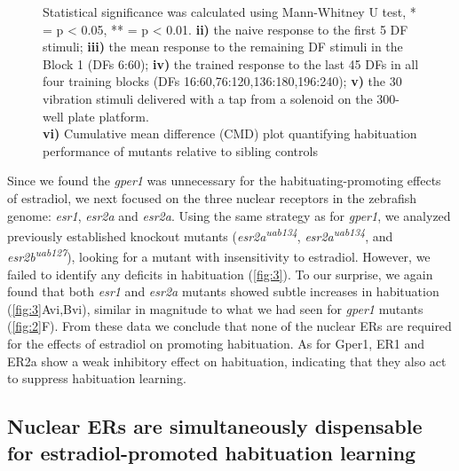 \documentclass[10pt,lineno]{RandlettLab_elife}
\begin{document}
{\begin{figure}
\begin{fullwidth}
\begin{center}
{Statistical significance was calculated using Mann-Whitney U test, * = p < 0.05, ** = p < 0.01.
\textbf{ii)} the naive response to the first 5 DF stimuli; \textbf{iii)} the mean response to the remaining DF stimuli in the Block 1 (DFs 6:60); \textbf{iv)} the trained response to the last 45 DFs in all four training blocks (DFs 16:60,76:120,136:180,196:240); \textbf{v)} the 30 vibration stimuli delivered with a tap from a solenoid on the 300-well plate platform.
\\ \textbf{vi)} Cumulative mean difference (CMD) plot quantifying habituation performance of mutants relative to sibling controls
}

\label{fig:3}

\end{center}
\end{fullwidth}
\end{figure}

Since we found the \emph{gper1} was unnecessary for the habituating-promoting effects of estradiol, we next focused on the three nuclear receptors in the zebrafish genome: \emph{esr1}, \emph{esr2a} and \emph{esr2a}. 
Using the same strategy as for \emph{gper1}, we analyzed previously established knockout mutants (\emph{esr2a\textsuperscript{uab134}}, \emph{esr2a\textsuperscript{uab134}}, and \emph{esr2b\textsuperscript{uab127}}), looking for a mutant with insensitivity to estradiol. 
However, we failed to identify any deficits in habituation (\autoref{fig:3}).
To our surprise, we again found that both \emph{esr1} and \emph{esr2a} mutants showed subtle increases in habituation (\autoref{fig:3}Avi,Bvi), similar in magnitude to what we had seen for \emph{gper1} mutants (\autoref{fig:2}F). 
From these data we conclude that none of the nuclear ERs are required for the effects of estradiol on promoting habituation. As for Gper1, ER1 and ER2a show a weak inhibitory effect on habituation, indicating that they also act to suppress habituation learning.

\subsection{Nuclear ERs are simultaneously dispensable for estradiol-promoted habituation learning}

}
\end{document}
